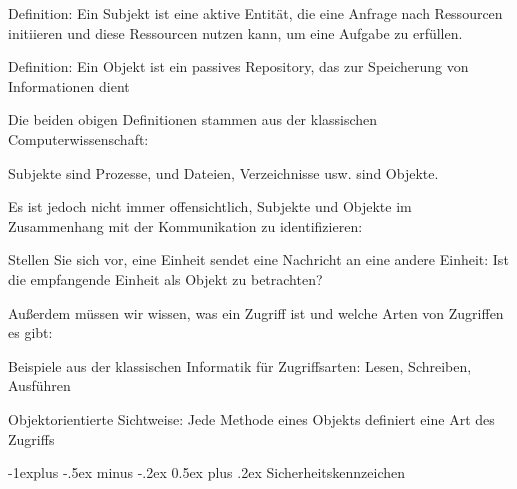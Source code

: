 \documentclass[a4paper]{article}
\makeatletter
\renewcommand{\subsection}{\@startsection{subsection}{2}{0mm}%
 {-1explus -.5ex minus -.2ex}%
 {0.5ex plus .2ex}%
 {\normalfont\normalsize\bfseries}}
\makeatother
\begin{document}
\begin{multicols}{3}
      \begin{itemize*}
            \item Definition: Ein Subjekt ist eine aktive Entität, die eine Anfrage nach
            Ressourcen initiieren und diese Ressourcen nutzen kann, um eine
            Aufgabe zu erfüllen.
            \item Definition: Ein Objekt ist ein passives Repository, das zur
            Speicherung von Informationen dient
            \item Die beiden obigen Definitionen stammen aus der klassischen
            Computerwissenschaft:
            \begin{itemize*}
                  \item Subjekte sind Prozesse, und Dateien, Verzeichnisse usw. sind Objekte.
            \end{itemize*}
            \item Es ist jedoch nicht immer offensichtlich, Subjekte und Objekte im
            Zusammenhang mit der Kommunikation zu identifizieren:
            \begin{itemize*}
                  \item Stellen Sie sich vor, eine Einheit sendet eine Nachricht an eine andere Einheit: Ist die empfangende Einheit als Objekt zu betrachten?
            \end{itemize*}
            \item Außerdem müssen wir wissen, was ein Zugriff ist und welche Arten von
            Zugriffen es gibt:
            \begin{itemize*}
                  \item Beispiele aus der klassischen Informatik für Zugriffsarten: Lesen, Schreiben, Ausführen
                  \item Objektorientierte Sichtweise: Jede Methode eines Objekts definiert eine Art des Zugriffs
            \end{itemize*}
      \end{itemize*}


      \subsection{Sicherheitskennzeichen}


\end{multicols}
\end{document}
